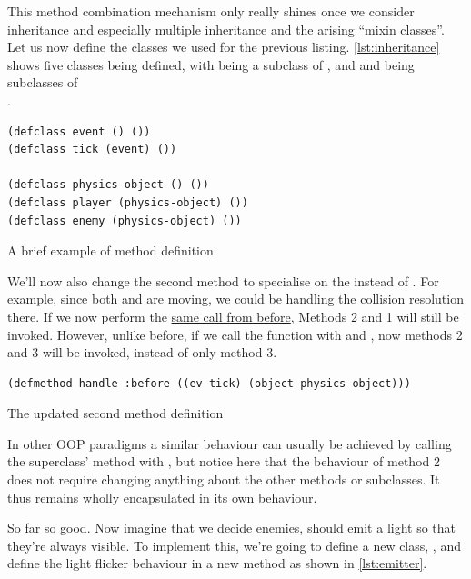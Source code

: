 \documentclass[a4paper]{paper}
\begin{document}
This method combination mechanism only really shines once we consider inheritance and especially multiple inheritance and the arising ``mixin classes''. Let us now define the classes we used for the previous listing. \autoref{lst:inheritance} shows five classes being defined, with  being a subclass of , and  and  being subclasses of \\.

\begin{listing}[H]
\begin{verbatim}
(defclass event () ())
(defclass tick (event) ())

(defclass physics-object () ())
(defclass player (physics-object) ())
(defclass enemy (physics-object) ())
\end{verbatim}
\caption{A brief example of method definition}
\label{lst:inheritance}
\end{listing}

We'll now also change the second method to specialise on the  instead of . For example, since both  and  are moving, we could be handling the collision resolution there. If we now perform the \hyperlink{first-call}{same call from before}, Methods 2 and 1 will still be invoked. However, unlike before, if we call the function with  and , now methods 2 and 3 will be invoked, instead of only method 3.

\begin{listing}[h]
\begin{verbatim}
(defmethod handle :before ((ev tick) (object physics-object)))
\end{verbatim}
\caption{The updated second method definition}
\label{lst:updated method}
\end{listing}

In other OOP paradigms a similar behaviour can usually be achieved by calling the superclass' method with , but notice here that the behaviour of method 2 does not require changing anything about the other methods or subclasses. It thus remains wholly encapsulated in its own behaviour.

So far so good. Now imagine that we decide enemies, should emit a light so that they're always visible. To implement this, we're going to define a new class, , and define the light flicker behaviour in a new  method as shown in \autoref{lst:emitter}.
\end{document}
